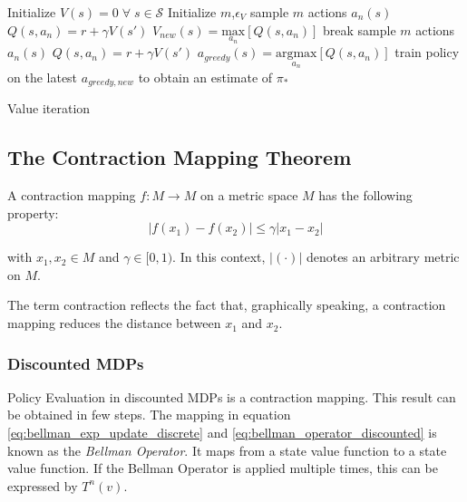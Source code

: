 \begin{algorithm}[hbt]
	\begin{algorithmic}[0] %
		\State Initialize $V(s) = 0 \; \forall \; s \in \mathcal{S}$
		\State Initialize $m$,\;$\epsilon_V$
		\State sample $m$ actions $a_n(s)$
		\State $Q(s,a_n) = r + \gamma V(s')$
		\EndFor		
		\State $V_{new}(s)=\underset{a_n}{\text{max}}[Q(s,a_n)]$
		\EndFor
		\State break
		\EndIf
		\EndWhile
		\State sample $m$ actions $a_n(s)$
		\State $Q(s,a_n) = r + \gamma V(s')$
		\EndFor
		\State $a_{greedy}(s)=\underset{a_n}{\text{argmax}}[Q(s,a_n)]$
		\EndFor
		\EndFunction
		\State train policy on the latest $a_{greedy,new}$ to obtain an estimate of $\pi_*$
		\EndFunction
	\end{algorithmic}	
	\caption{Value iteration}
	\label{algo:vi}
\end{algorithm}

\subsection{The Contraction Mapping Theorem}
\label{sec:contraction_mappings}
A contraction mapping $f: M \to M$ on a metric space $M$ has the following property:
\begin{equation}
|f(x_1)-f(x_2)| \leq \gamma |x_1-x_2|
\end{equation}

with $x_1,x_2 \in M$ and $\gamma \in [0,1)$. In this context,  $|(\cdot)|$ denotes an arbitrary metric on $M$.

The term contraction reflects the fact that, graphically speaking, a contraction mapping reduces the distance between $x_1$ and $x_2$.

\subsubsection*{Discounted MDPs}

Policy Evaluation in discounted MDPs is a contraction mapping. This result can be obtained in few steps. The mapping in equation \ref{eq:bellman_exp_update_discrete} and \ref{eq:bellman_operator_discounted} is known as the \textit{Bellman Operator}. It maps from a state value function to a state value function. If the Bellman Operator is applied multiple times, this can be expressed by $T^n(v)$.

